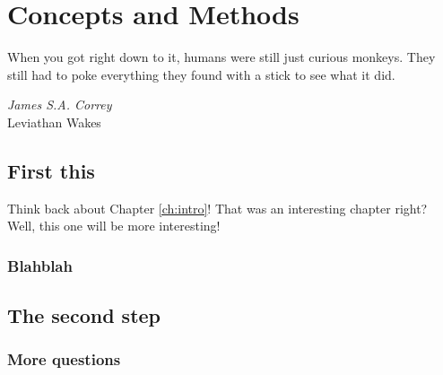 \cleardoubleevenemptypage
\chapter{Concepts and Methods}
\label{ch:methods}
\pgfmathsetmacro\chapclr{\colourarray[2]}
\hypersetup{
  citecolor  = \chapclr,
  linkcolor  = \chapclr,
  urlcolor   = \chapclr,
}

\epigraph{
  When you got right down to it, humans were still just curious monkeys. They still had to poke everything they found with a stick to see what it did.
}{
  \textit{James S.A. Correy} \\ Leviathan Wakes
}

\begin{center}
  \begin{minipage}{\abstractwidth\textwidth}
    \begin{small}
      \lipsum[1]
    \end{small}
  \end{minipage}
  \vspace{0.5cm}
\end{center}

\clearpage

\section{First this}
Think back about Chapter \ref{ch:intro}! That was an interesting chapter right? Well, this one will be more interesting!

\blindtext[1]
\subsection{Blahblah}
\blindtext[2]
\section{The second step}
\blindtext[1]
\subsection{More questions}
\blindtext[2]

